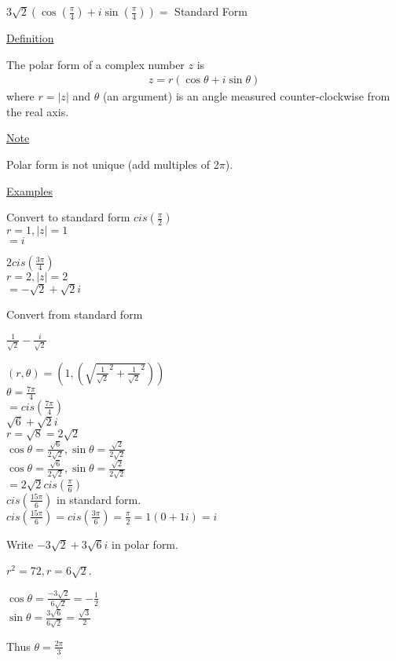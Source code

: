 \documentclass{article}
\begin{document}
$3\sqrt{2}(\cos(\frac{\pi}{4}) + i\sin(\frac{\pi}{4})) = $ Standard Form

\underline{Definition}

The polar form of a complex number $z$ is 
\begin{align*}
    z = r(\cos\theta + i\sin\theta)
\end{align*}
where  $r = |z|$ and $\theta$ (an argument) is an angle measured counter-clockwise from the real axis.

\underline{Note}

Polar form is not unique (add multiples of 2$\pi$).

\underline{Examples}

Convert to standard form
$cis(\frac{\pi}{2})$\\
$r=1, |z| = 1$\\
$=i$

$2cis(\frac{3\pi}{4})$\\
$r=2, |z|=2$\\
$= -\sqrt{2} +\sqrt{2}i$

Convert from standard form

$\frac{1}{\sqrt{2}} - \frac{i}{\sqrt{2}}$

$(r,\theta) = (1,(\sqrt{\frac{1}{\sqrt{2}}^2 + \frac{1}{\sqrt{2}}^2}))$\\
$\theta = \frac{7\pi}{4}$\\
$=cis(\frac{7\pi}{4})$\\

$\sqrt{6}+\sqrt{2}i$\\
$r = \sqrt{8} = 2\sqrt{2}$\\
$\cos\theta = \frac{\sqrt{6}}{2\sqrt{2}}, \sin\theta = \frac{\sqrt{2}}{2\sqrt{2}}$\\
$\cos\theta = \frac{\sqrt{6}}{2\sqrt{2}}, \sin\theta = \frac{\sqrt{2}}{2\sqrt{2}}$\\
$=2\sqrt{2}cis(\frac{\pi}{6})$\\

$cis(\frac{15\pi}{6})$ in standard form.\\
$cis(\frac{15\pi}{6}) = cis(\frac{3\pi}{6}) = \frac{\pi}{2} = 1(0 + 1i) = i$

Write $-3\sqrt{2} + 3\sqrt{6}i$ in polar form.

$r^2 = 72, r = 6\sqrt{2}$.

$\cos\theta = \frac{-3\sqrt{2}}{6\sqrt{2}} = -\frac{1}{2}$\\
$\sin\theta = \frac{3\sqrt{6}}{6\sqrt{2}} = \frac{\sqrt{3}}{2}$

Thus $\theta = \frac{2\pi}{3}$
\end{document}
